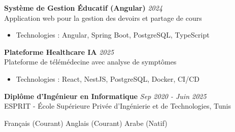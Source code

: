 \documentclass[11pt,a4paper]{article}
\begin{document}

\textbf{Système de Gestion Éducatif (Angular)} \hfill \textit{2024}\\[-2pt]
Application web pour la gestion des devoirs et partage de cours\\[-5pt]
\begin{itemize}[leftmargin=8pt,itemsep=0pt,topsep=1pt]
  \item Technologies : Angular, Spring Boot, PostgreSQL, TypeScript
\end{itemize}\vspace{2pt}

\textbf{Plateforme Healthcare IA} \hfill \textit{2025}\\[-2pt]
Plateforme de télémédecine avec analyse de symptômes\\[-5pt]
\begin{itemize}[leftmargin=8pt,itemsep=0pt,topsep=1pt]
  \item Technologies : React, NestJS, PostgreSQL, Docker, CI/CD
\end{itemize}\vspace{2pt}

\textbf{Diplôme d'Ingénieur en Informatique} \hfill \textit{Sep 2020 - Juin 2025}\\[-2pt]
ESPRIT - École Supérieure Privée d'Ingénierie et de Technologies, Tunis

Français (Courant) \textbar{} Anglais (Courant) \textbar{} Arabe (Natif)
\end{document}

